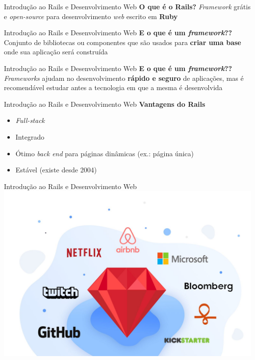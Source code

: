 \documentclass[10pt]{beamer}
\subtitle{Aula 3}
\date{07 de novembro de 2019}
\begin{document}
\maketitle

\begin{frame}{Introdução ao Rails e Desenvolvimento Web}
  \huge
  \textbf{O que é o Rails?}
  \vfill
  \LARGE
  \textit{Framework} grátis e \textit{open-source} para desenvolvimento \textit{web} escrito em \textbf{Ruby}
\end{frame}

\begin{frame}{Introdução ao Rails e Desenvolvimento Web}
  \huge
  \textbf{E o que é um \textit{framework}??}
  \vfill
  \LARGE
  Conjunto de bibliotecas ou componentes que são usados para \textbf{criar uma base} onde sua aplicação será construída
\end{frame}

\begin{frame}{Introdução ao Rails e Desenvolvimento Web}
  \huge
  \textbf{E o que é um \textit{framework}??}
  \vfill
  \LARGE
  \textit{Frameworks} ajudam no desenvolvimento \textbf{rápido e seguro} de aplicações, mas é recomendável estudar antes a tecnologia em que a mesma é desenvolvida
\end{frame}

\begin{frame}{Introdução ao Rails e Desenvolvimento Web}
  \huge
  \textbf{Vantagens do Rails}
  \vfill
  \LARGE
  \begin{itemize}
    \item \textit{Full-stack}
    \item Integrado
    \item Ótimo \textit{back end} para páginas dinâmicas (ex.: página única)
    \item Estável (existe desde 2004)
  \end{itemize}
\end{frame}

\begin{frame}{Introdução ao Rails e Desenvolvimento Web}
  \huge
  \includegraphics[width=\textwidth]{images/rails_companies.jpg}
\end{frame}
\end{document}
